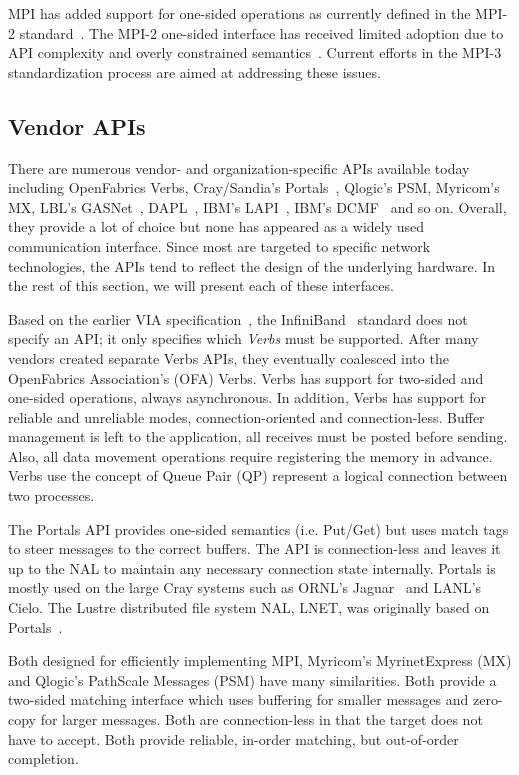 MPI has added support for one-sided operations as currently defined
in the MPI-2 standard~\cite{geist96:_mpi2_lyon}. The MPI-2 one-sided
interface has received limited adoption due to API complexity and
overly constrained semantics~\cite{bonachea-upc-mpi2}. Current efforts
in the MPI-3 standardization process are aimed at addressing these
issues. 


\subsection{Vendor APIs} There are numerous vendor- and
organization-specific APIs available today including OpenFabrics
Verbs, Cray/Sandia's Portals~\cite{portals}, Qlogic's
PSM, Myricom's MX, LBL's GASNet~\cite{gasnet}, 
DAPL~\cite{dapl}, IBM's LAPI~\cite{lapi_a_1998}, IBM's 
DCMF~\cite{Kumar:2008:DCM:1375527.1375544} and so on. 
Overall, they provide a lot of choice but none has appeared as 
a widely used communication interface. Since most are targeted to 
specific network technologies, the APIs tend to reflect the design 
of the underlying hardware. In the rest of this section, we will 
present each of these interfaces.

Based on the earlier VIA specification~\cite{via}, the InfiniBand~\cite{ibta} standard does not specify
an API; it only specifies which \emph{Verbs} must be supported. After many vendors created
separate Verbs APIs, they eventually coalesced into the OpenFabrics Association's (OFA)
Verbs. Verbs has support for two-sided and one-sided operations, always asynchronous. 
In addition, Verbs has support for reliable and unreliable modes, connection-oriented
and connection-less. Buffer management is left to the application, all receives must be 
posted before sending. Also, all data movement operations require registering the memory 
in advance. Verbs use the concept of Queue Pair (QP) represent a logical connection between 
two processes.

The Portals API provides one-sided semantics (i.e.  Put/Get) but uses match tags to steer
messages to the correct buffers. The API is connection-less and leaves it up to the NAL to
maintain any necessary connection state internally. Portals is mostly used on the large
Cray systems such as ORNL's Jaguar~\cite{jaguar_cug_2010} and LANL's Cielo.  The
Lustre distributed file system NAL, LNET, was originally based on Portals~\cite{lnet}.

Both designed for efficiently implementing MPI, Myricom's MyrinetExpress (MX) and 
Qlogic's PathScale Messages (PSM) have many similarities. Both provide a two-sided matching 
interface which uses buffering for smaller messages and zero-copy for larger messages.  
Both are connection-less in that the target does not have to accept.  Both provide reliable,
in-order matching, but out-of-order completion.

